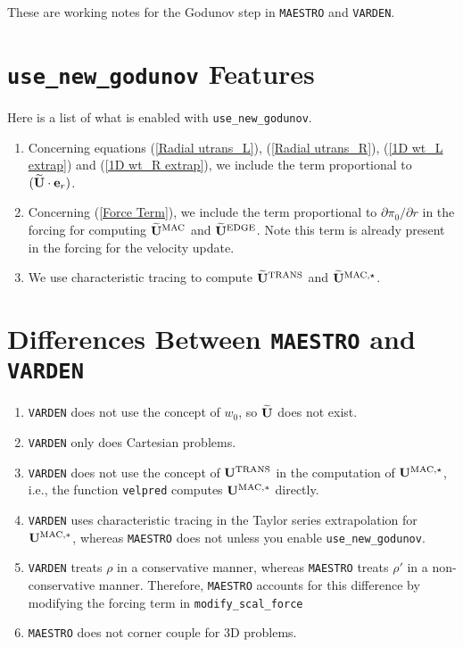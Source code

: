 These are working notes for the Godunov step in {\tt MAESTRO} 
and {\tt VARDEN}.

\section{{\tt use\_new\_godunov} Features}
Here is a list of what is enabled with {\tt use\_new\_godunov}.
\begin{enumerate}
\item Concerning equations (\ref{Radial utrans_L}), (\ref{Radial
  utrans_R}), (\ref{1D wt_L extrap}) and (\ref{1D wt_R extrap}), we
  include the term proportional to $(\widetilde{{\bf U}}\cdot{\bf e}_r)$.
\item Concerning (\ref{Force Term}), we include the
  term proportional to $\partial\pi_0/\partial r$ in the forcing for
  computing $\widetilde{{\bf U}}^{\rm MAC}$ and $\widetilde{{\bf U}}^{\rm EDGE}$.  Note this term is 
  already present in the forcing for the velocity update.
\item We use characteristic tracing to compute $\widetilde{{\bf U}}^{\rm TRANS}$
  and $\widetilde{{\bf U}}^{\rm MAC,\star}$.
\end{enumerate}

\section{Differences Between {\tt MAESTRO} and {\tt VARDEN}}
\begin{enumerate}
\item {\tt VARDEN} does not use the concept of $w_0$, so $\widetilde{{\bf U}}$ does
  not exist.
\item {\tt VARDEN} only does Cartesian problems.
\item {\tt VARDEN} does not use the concept of ${\bf U}^{\rm TRANS}$ in the
  computation of ${\bf U}^{\rm MAC,\star}$, i.e., the function {\tt velpred}
  computes ${\bf U}^{\rm MAC,*}$ directly.
\item {\tt VARDEN} uses characteristic tracing in the Taylor series
  extrapolation for ${\bf U}^{\rm MAC,*}$, whereas {\tt MAESTRO} does not 
  unless you enable {\tt use\_new\_godunov}.
\item {\tt VARDEN} treats $\rho$ in a conservative manner, whereas
  {\tt MAESTRO} treats $\rho'$ in a non-conservative manner.
  Therefore, {\tt MAESTRO} accounts for this difference by modifying
  the forcing term in {\tt modify\_scal\_force}
\item {\tt MAESTRO} does not corner couple for 3D problems.
\end{enumerate}

